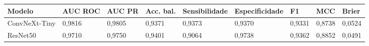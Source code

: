 \begin{tabular}{lllllllll}
\toprule
Modelo & AUC ROC & AUC PR & Acc. bal. & Sensibilidade & Especificidade & F1 & MCC & Brier \\
\midrule
ConvNeXt-Tiny & 0,9816 & 0,9805 & 0,9371 & 0,9373 & 0,9370 & 0,9331 & 0,8738 & 0,0524 \\
ResNet50 & 0,9710 & 0,9750 & 0,9401 & 0,9064 & 0,9738 & 0,9362 & 0,8852 & 0,0491 \\
\bottomrule
\end{tabular}

